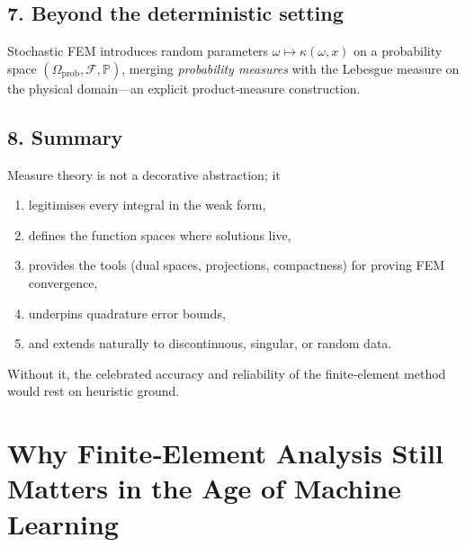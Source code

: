 \documentclass[12pt]{article}
\theoremstyle{definition} %
\theoremstyle{plain} %
\begin{document}
\subsection*{7.  Beyond the deterministic setting}
Stochastic FEM introduces random parameters
\(
	\omega\mapsto \kappa(\omega,x)
\)
on a probability space $(\Omega_\mathrm{prob},\mathcal{F},\mathbb{P})$,
merging \emph{probability measures} with the Lebesgue measure on the
physical domain—an explicit product‑measure construction.

\subsection*{8.  Summary}
Measure theory is not a decorative abstraction; it
\begin{enumerate}
	\item legitimises every integral in the weak form,
	\item defines the function spaces where solutions live,
	\item provides the tools (dual spaces, projections, compactness) for
	      proving FEM convergence,
	\item underpins quadrature error bounds,
	\item and extends naturally to discontinuous, singular, or random data.
\end{enumerate}
Without it, the celebrated accuracy and reliability of the finite‑element
method would rest on heuristic ground.
\section*{Why Finite‐Element Analysis Still Matters in the Age of Machine Learning}
\end{document}
